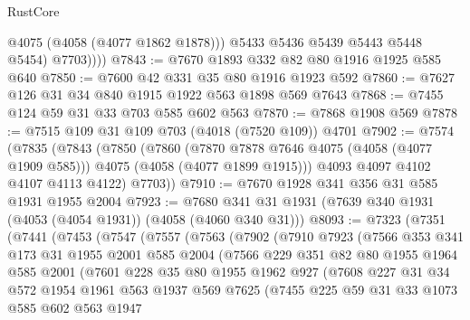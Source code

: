 \begin{lexlean}{RustCore}
\begin{coremodule}
                @4075
                (@4058 (@4077 @1862 @1878)))
              @5433
              @5436
              @5439
              @5443
              @5448
              @5454)
            @7703))))
@7843 := @7670 @1893 @332 @82 @80 @1916 @1925 @585 @640
@7850 := @7600 @42 @331 @35 @80 @1916 @1923 @592
@7860 := @7627 @126 @31 @34 @840 @1915 @1922 @563 @1898 @569 @7643
@7868 := @7455 @124 @59 @31 @33 @703 @585 @602 @563
@7870 := @7868 @1908 @569
@7878 := @7515 @109 @31 @109 @703 (@4018 (@7520 @109)) @4701
@7902 := @7574
    (@7835
      (@7843
        (@7850
          (@7860
            (@7870 @7878 @7646 @4075 (@4058 (@4077 @1909 @585)))
            @4075
            (@4058 (@4077 @1899 @1915)))
          @4093
          @4097
          @4102
          @4107
          @4113
          @4122)
        @7703))
@7910 := @7670 @1928 @341 @356 @31 @585 @1931 @1955 @2004
@7923 := @7680 @341 @31 @1931 (@7639 @340 @1931 (@4053 (@4054 @1931)) (@4058 (@4060 @340 @31)))
@8093 := @7323
    (@7351
      (@7441
        (@7453
          (@7547
            (@7557
              (@7563
                (@7902
                  (@7910
                    @7923
                    (@7566
                      @353
                      @341
                      @173
                      @31
                      @1955
                      @2001
                      @585
                      @2004
                      (@7566
                        @229
                        @351
                        @82
                        @80
                        @1955
                        @1964
                        @585
                        @2001
                        (@7601
                          @228
                          @35
                          @80
                          @1955
                          @1962
                          @927
                          (@7608
                            @227
                            @31
                            @34
                            @572
                            @1954
                            @1961
                            @563
                            @1937
                            @569
                            @7625
                            (@7455
                              @225
                              @59
                              @31
                              @33
                              @1073
                              @585
                              @602
                              @563
                              @1947

\end{coremodule}
\end{lexlean}
